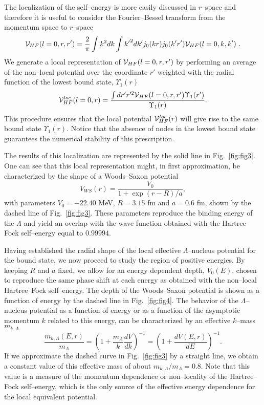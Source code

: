 The localization of the self--energy is more easily discussed in $r$--space
and therefore it is useful to consider the Fourier--Bessel transform
from the momentum space to $r$--space
\begin{equation}
  {\cal V}_{HF}(l=0,r,r')= \frac {2}{\pi} \int k^2 dk \int {k'}^2
                       dk' j_0(kr) j_0(k' r') {\cal V}_{HF}(l=0,k,k') \ .
  \label{eq:tranbe}
\end{equation}
We  generate a local representation 
of ${\cal V}_{HF}(l=0,r,r')$ by performing an average of
the non--local potential over the coordinate $r'$  weighted with the
radial function of the lowest bound state, $\Upsilon_1(r)$
\begin{equation}
     {\cal V}_{HF}^{loc}(l=0,r)= \frac {\int dr' r'^2 {\cal V}_{HF}(l=0,
                                 r,r') \Upsilon_{1}(r')}{\Upsilon_1(r)}.
     \label{eq:local}
\end{equation}
This procedure ensures that the local potential ${\cal V}_{HF}^{loc}(r)$ will
give rise to the same bound state 
$\Upsilon_1(r)$. Notice that the absence of nodes in the lowest bound
state guarantees the numerical stability of this prescription.

The results of this localization are represented by the solid line
in Fig.\  \ref{fig:fig3}. One can see that this
local representation might, in first approximation, be characterized
by the shape of a Woods--Saxon potential
\begin{equation}
      V_{WS}(r)=\frac{V_0}{1+\exp{(r-R)/a}},
      \label{eq:ws}
\end{equation}
with parameters $V_0=-22.40$ MeV, $R=3.15$ fm and
$a=0.6$ fm, shown by the dashed
line of Fig.\ \ref{fig:fig3}.
These parameters reproduce the binding energy of the
$\Lambda$ and yield an
overlap with the wave function obtained with the Hartree--Fock
self--energy equal to $0.99994$.

Having established the radial shape of the local effective
$\Lambda$--nucleus potential for the bound state, we now proceed to
study the region of positive energies. By keeping
$R$ and
$a$ fixed, we allow for an energy dependent depth, $V_0(E)$, chosen to
reproduce the same phase shift at each energy as obtained with the
non--local Hartree--Fock
self--energy. The depth of the Woods--Saxon potential
is shown as a function of energy by
the dashed line in Fig.\ \ref{fig:fig4}.
The behavior of the $\Lambda$--nucleus potential as a function of
energy or as a function of the asymptotic momentum $k$ related to this
energy, can be characterized by an effective $k$--mass $m_{k,\Lambda}$
 \cite{ms91}
\begin{equation}
     \frac{m_{k,\Lambda}(E,r)}{m_{\Lambda}}
=\left(1+\frac{m_{\Lambda}}{k}\frac{dV}{dk}\right)^{-1} =
\left(1+\frac{dV(E,r)}{dE}\right)^{-1}. \label{eq:kmas}
\end{equation}
If we approximate the dashed curve
in Fig.\  \ref{fig:fig3} by a straight line, we obtain a constant
value of this effective mass of about $m_{k,\Lambda}/m_{\Lambda}=0.8$.
Note that this
value is a measure of the momentum dependence or non--locality of the
Hartree--Fock 
self--energy, which is the only source of the effective energy
dependence for the local equivalent potential.

